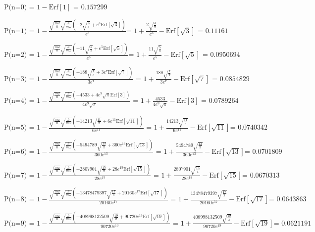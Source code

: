 \documentclass[12pt]{article}
\begin{document}
{\small
\noindent\(\text{P(n=0) = }1-\text{Erf}[1]\text{ = }0.157299\)

\noindent\(\text{P(n=}1\text{) = }1-\frac{\sqrt{\frac{m \omega }{\hbar }} \sqrt{\frac{\hbar }{m \omega }} \left(-2 \sqrt{\frac{3}{\pi }}+e^3 \text{Erf}\left[\sqrt{3}\right]\right)}{e^3}\text{
= }1+\frac{2 \sqrt{\frac{3}{\pi }}}{e^3}-\text{Erf}\left[\sqrt{3}\right]\text{ = }0.11161\)

\noindent\(\text{P(n=}2\text{) = }1-\frac{\sqrt{\frac{m \omega }{\hbar }} \sqrt{\frac{\hbar }{m \omega }} \left(-11 \sqrt{\frac{5}{\pi }}+e^5 \text{Erf}\left[\sqrt{5}\right]\right)}{e^5}\text{
= }1+\frac{11 \sqrt{\frac{5}{\pi }}}{e^5}-\text{Erf}\left[\sqrt{5}\right]\text{ = }0.0950694\)

\noindent\(\text{P(n=}3\text{) = }1-\frac{\sqrt{\frac{m \omega }{\hbar }} \sqrt{\frac{\hbar }{m \omega }} \left(-188 \sqrt{\frac{7}{\pi }}+3 e^7
\text{Erf}\left[\sqrt{7}\right]\right)}{3 e^7}\text{ = }1+\frac{188 \sqrt{\frac{7}{\pi }}}{3 e^7}-\text{Erf}\left[\sqrt{7}\right]\text{ = }0.0854829\)

\noindent\(\text{P(n=}4\text{) = }1-\frac{\sqrt{\frac{m \omega }{\hbar }} \sqrt{\frac{\hbar }{m \omega }} \left(-4533+4 e^9 \sqrt{\pi } \text{Erf}[3]\right)}{4
e^9 \sqrt{\pi }}\text{ = }1+\frac{4533}{4 e^9 \sqrt{\pi }}-\text{Erf}[3]\text{ = }0.0789264\)

\noindent\(\text{P(n=}5\text{) = }1-\frac{\sqrt{\frac{m \omega }{\hbar }} \sqrt{\frac{\hbar }{m \omega }} \left(-14213 \sqrt{\frac{11}{\pi }}+6 e^{11}
\text{Erf}\left[\sqrt{11}\right]\right)}{6 e^{11}}\text{ = }1+\frac{14213 \sqrt{\frac{11}{\pi }}}{6 e^{11}}-\text{Erf}\left[\sqrt{11}\right]\text{
= }0.0740342\)

\noindent\(\text{P(n=}6\text{) = }1-\frac{\sqrt{\frac{m \omega }{\hbar }} \sqrt{\frac{\hbar }{m \omega }} \left(-5494789 \sqrt{\frac{13}{\pi }}+360
e^{13} \text{Erf}\left[\sqrt{13}\right]\right)}{360 e^{13}}\text{ = }1+\frac{5494789 \sqrt{\frac{13}{\pi }}}{360 e^{13}}-\text{Erf}\left[\sqrt{13}\right]\text{
= }0.0701809\)

\noindent\(\text{P(n=}7\text{) = }1-\frac{\sqrt{\frac{m \omega }{\hbar }} \sqrt{\frac{\hbar }{m \omega }} \left(-2807901 \sqrt{\frac{15}{\pi }}+28
e^{15} \text{Erf}\left[\sqrt{15}\right]\right)}{28 e^{15}}\text{ = }1+\frac{2807901 \sqrt{\frac{15}{\pi }}}{28 e^{15}}-\text{Erf}\left[\sqrt{15}\right]\text{
= }0.0670313\)

\noindent\(\text{P(n=}8\text{) = }1-\frac{\sqrt{\frac{m \omega }{\hbar }} \sqrt{\frac{\hbar }{m \omega }} \left(-13478479397 \sqrt{\frac{17}{\pi
}}+20160 e^{17} \text{Erf}\left[\sqrt{17}\right]\right)}{20160 e^{17}}\text{ = }1+\frac{13478479397 \sqrt{\frac{17}{\pi }}}{20160 e^{17}}-\text{Erf}\left[\sqrt{17}\right]\text{
= }0.0643863\)

\noindent\(\text{P(n=}9\text{) = }1-\frac{\sqrt{\frac{m \omega }{\hbar }} \sqrt{\frac{\hbar }{m \omega }} \left(-408998132509 \sqrt{\frac{19}{\pi
}}+90720 e^{19} \text{Erf}\left[\sqrt{19}\right]\right)}{90720 e^{19}}\text{ = }1+\frac{408998132509 \sqrt{\frac{19}{\pi }}}{90720 e^{19}}-\text{Erf}\left[\sqrt{19}\right]\text{
= }0.0621191\)
}
\end{document}
